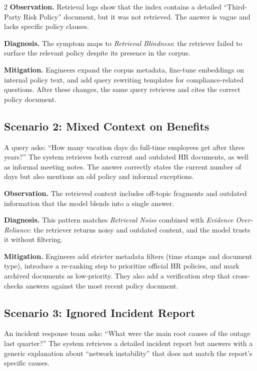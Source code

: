 \documentclass[11pt,a4paper]{article}
\begin{document}
\begin{multicols}{2}
\textbf{Observation.} Retrieval logs show that the index contains a detailed ``Third-Party Risk Policy'' document, but it was not retrieved. The answer is vague and lacks specific policy clauses.

\textbf{Diagnosis.} The symptom maps to \textit{Retrieval Blindness}: the retriever failed to surface the relevant policy despite its presence in the corpus.

\textbf{Mitigation.} Engineers expand the corpus metadata, fine-tune embeddings on internal policy text, and add query rewriting templates for compliance-related questions. After these changes, the same query retrieves and cites the correct policy document.

\subsection{Scenario 2: Mixed Context on Benefits}

A query asks: ``How many vacation days do full-time employees get after three years?'' The system retrieves both current and outdated HR documents, as well as informal meeting notes. The answer correctly states the current number of days but also mentions an old policy and informal exceptions.

\textbf{Observation.} The retrieved context includes off-topic fragments and outdated information that the model blends into a single answer.

\textbf{Diagnosis.} This pattern matches \textit{Retrieval Noise} combined with \textit{Evidence Over-Reliance}: the retriever returns noisy and outdated content, and the model trusts it without filtering.

\textbf{Mitigation.} Engineers add stricter metadata filters (time stamps and document type), introduce a re-ranking step to prioritize official HR policies, and mark archived documents as low-priority. They also add a verification step that cross-checks answers against the most recent policy document.

\subsection{Scenario 3: Ignored Incident Report}

An incident response team asks: ``What were the main root causes of the outage last quarter?'' The system retrieves a detailed incident report but answers with a generic explanation about ``network instability'' that does not match the report's specific causes.


\end{multicols}
\end{document}
